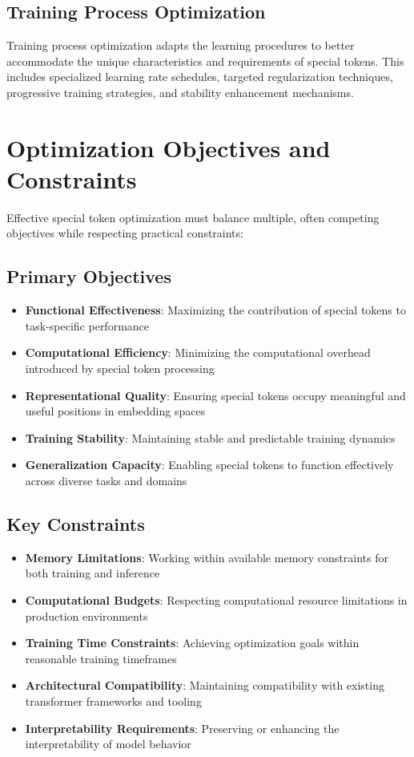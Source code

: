 \subsection{Training Process Optimization}

Training process optimization adapts the learning procedures to better accommodate the unique characteristics and requirements of special tokens. This includes specialized learning rate schedules, targeted regularization techniques, progressive training strategies, and stability enhancement mechanisms.

\section{Optimization Objectives and Constraints}

Effective special token optimization must balance multiple, often competing objectives while respecting practical constraints:

\subsection{Primary Objectives}

\begin{itemize}
\item \textbf{Functional Effectiveness}: Maximizing the contribution of special tokens to task-specific performance
\item \textbf{Computational Efficiency}: Minimizing the computational overhead introduced by special token processing
\item \textbf{Representational Quality}: Ensuring special tokens occupy meaningful and useful positions in embedding spaces
\item \textbf{Training Stability}: Maintaining stable and predictable training dynamics
\item \textbf{Generalization Capacity}: Enabling special tokens to function effectively across diverse tasks and domains
\end{itemize}

\subsection{Key Constraints}

\begin{itemize}
\item \textbf{Memory Limitations}: Working within available memory constraints for both training and inference
\item \textbf{Computational Budgets}: Respecting computational resource limitations in production environments
\item \textbf{Training Time Constraints}: Achieving optimization goals within reasonable training timeframes
\item \textbf{Architectural Compatibility}: Maintaining compatibility with existing transformer frameworks and tooling
\item \textbf{Interpretability Requirements}: Preserving or enhancing the interpretability of model behavior
\end{itemize}


